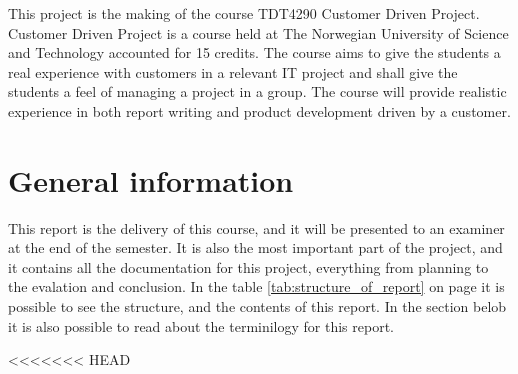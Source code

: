 This project is the making of the course TDT4290 Customer Driven Project. 
Customer Driven Project is a course held at The Norwegian University of Science and Technology accounted for 15 credits. The course aims to give the students a real experience with customers in a relevant IT project and shall give the students a feel of managing a project in a group. The course will provide realistic experience in both report writing and product development driven by a customer. 
\section{General information}
This report is the delivery of this course, and it will be presented to an examiner at the end of the semester. It is also the most important part of the project, and it contains all the documentation for this project, everything from planning to the evalation and conclusion. In the table \ref{tab:structure_of_report} on page \pageref{tab:structure_of_report} it is possible to see the structure, and the contents of this report. In the section belob it is also possible to read about the terminilogy for this report.

<<<<<<< HEAD

